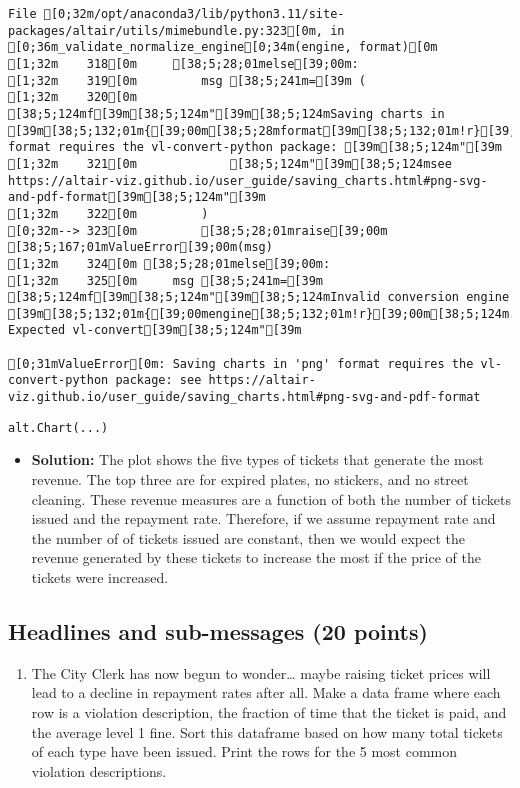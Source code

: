 \documentclass[
  letterpaper,
  DIV=11,
  numbers=noendperiod]{scrartcl}
\providecommand{\tightlist}{%
  \setlength{\itemsep}{0pt}\setlength{\parskip}{0pt}}\usepackage{longtable,booktabs,array}
\begin{document}
\begin{verbatim}
File [0;32m/opt/anaconda3/lib/python3.11/site-packages/altair/utils/mimebundle.py:323[0m, in [0;36m_validate_normalize_engine[0;34m(engine, format)[0m
[1;32m    318[0m     [38;5;28;01melse[39;00m:
[1;32m    319[0m         msg [38;5;241m=[39m (
[1;32m    320[0m             [38;5;124mf[39m[38;5;124m"[39m[38;5;124mSaving charts in [39m[38;5;132;01m{[39;00m[38;5;28mformat[39m[38;5;132;01m!r}[39;00m[38;5;124m format requires the vl-convert-python package: [39m[38;5;124m"[39m
[1;32m    321[0m             [38;5;124m"[39m[38;5;124msee https://altair-viz.github.io/user_guide/saving_charts.html#png-svg-and-pdf-format[39m[38;5;124m"[39m
[1;32m    322[0m         )
[0;32m--> 323[0m         [38;5;28;01mraise[39;00m [38;5;167;01mValueError[39;00m(msg)
[1;32m    324[0m [38;5;28;01melse[39;00m:
[1;32m    325[0m     msg [38;5;241m=[39m [38;5;124mf[39m[38;5;124m"[39m[38;5;124mInvalid conversion engine [39m[38;5;132;01m{[39;00mengine[38;5;132;01m!r}[39;00m[38;5;124m. Expected vl-convert[39m[38;5;124m"[39m

[0;31mValueError[0m: Saving charts in 'png' format requires the vl-convert-python package: see https://altair-viz.github.io/user_guide/saving_charts.html#png-svg-and-pdf-format
\end{verbatim}

\begin{verbatim}
alt.Chart(...)
\end{verbatim}

\begin{itemize}
\tightlist
\item
  \textbf{Solution:} The plot shows the five types of tickets that
  generate the most revenue. The top three are for expired plates, no
  stickers, and no street cleaning. These revenue measures are a
  function of both the number of tickets issued and the repayment rate.
  Therefore, if we assume repayment rate and the number of of tickets
  issued are constant, then we would expect the revenue generated by
  these tickets to increase the most if the price of the tickets were
  increased.
\end{itemize}

\subsection{Headlines and sub-messages (20
points)}\label{headlines-and-sub-messages-20-points}

\begin{enumerate}
\def\labelenumi{\arabic{enumi}.}
\tightlist
\item
  The City Clerk has now begun to wonder\ldots{} maybe raising ticket
  prices will lead to a decline in repayment rates after all. Make a
  data frame where each row is a violation description, the fraction of
  time that the ticket is paid, and the average level 1 fine. Sort this
  dataframe based on how many total tickets of each type have been
  issued. Print the rows for the 5 most common violation descriptions.
\end{enumerate}
\end{document}
